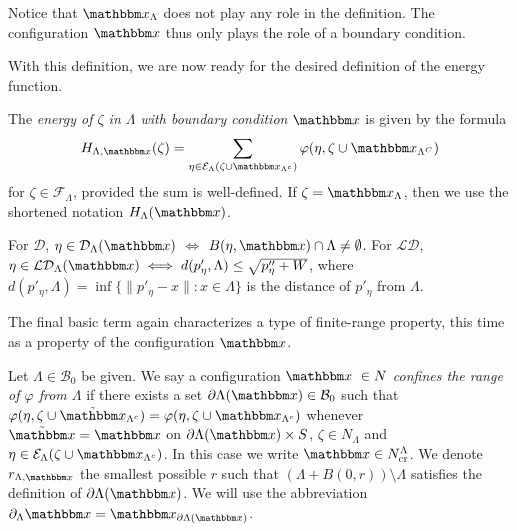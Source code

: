 Notice that $\x_\Lambda$ does not play any role in the definition. The configuration $\x$ thus only plays the role of a boundary condition.

With this definition, we are now ready for the desired definition of the energy function.

\begin{definition}\label{def:energy}
The \textit{energy of $\zeta$ in $\Lambda$ with boundary condition $\x$} is given by the formula
$$H_{\Lambda,\x}(\zeta) = \sum_{\eta \in \mathcal E_\Lambda(\zeta \cup \x_{\Lambda^c})} \varphi(\eta, \zeta \cup \x_{\Lambda^C})$$
for $\zeta \in \mathcal F_{\Lambda}$, provided the sum is well-defined. \newline
If $\zeta = \x_\Lambda$, then we use the shortened notation $H_\Lambda(\x)$.
\end{definition}

\begin{remark}
For $\mathcal D$, $\eta \in \mathcal D_\Lambda(\x)$ $\iff$ $B(\eta,\x) \cap \Lambda \neq \emptyset$. \newline
For $\mathcal {LD}$, $\eta \in \mathcal {LD}_\Lambda(\x) \iff d(p'_\eta,\Lambda) \leq \sqrt{p''_\eta + W}$, where $d(p'_\eta,\Lambda) = \inf\{\|p'_\eta - x\|: x \in \Lambda\}$ is the distance of $p'_\eta$ from $\Lambda$.    \newline
\end{remark}

The final basic term again characterizes a type of finite-range property, this time as a property of the configuration $\x$.

\begin{definition}\label{def:cr}
	Let $\Lambda \in \mathcal B_0$ be given. We say a configuration $\x\ \in N$ \textit{confines the range of $\varphi$ from $\Lambda$} if there exists a set $\partial \Lambda(\x) \in \mathcal B_0$ such that $\varphi(\eta,\zeta \cup \tilde{\x}_{\Lambda^c}) = \varphi(\eta,\zeta\cup\x_{\Lambda^c})$ whenever $\tilde{\x} = \x$ on $\partial \Lambda(\x)\times S$, $\zeta \in N_\Lambda$ and $\eta \in \mathcal E_\Lambda(\zeta\cup\x_{\Lambda^c})$. In this case we write $\x \in N^\Lambda_\text{cr}$. We denote $r_{\Lambda,\x}$ the smallest possible $r$ such that $(\Lambda + B(0,r))\setminus \Lambda$ satisfies the definition of $\partial \Lambda(\x)$. We will use the abbreviation $\partial_\Lambda \x = \x_{\partial \Lambda(\x)}$.
\end{definition}

